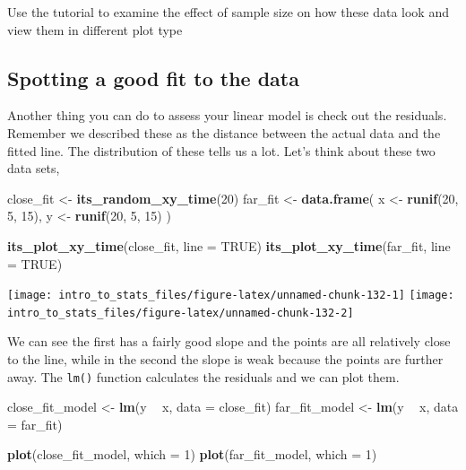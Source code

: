 \documentclass[
]{book}
\newenvironment{Shaded}{\begin{snugshade}}{\end{snugshade}}
\newcommand{\DataTypeTok}[1]{\textcolor[rgb]{0.13,0.29,0.53}{#1}}
\newcommand{\DecValTok}[1]{\textcolor[rgb]{0.00,0.00,0.81}{#1}}
\newcommand{\KeywordTok}[1]{\textcolor[rgb]{0.13,0.29,0.53}{\textbf{#1}}}
\newcommand{\NormalTok}[1]{#1}
\newcommand{\OperatorTok}[1]{\textcolor[rgb]{0.81,0.36,0.00}{\textbf{#1}}}
\newcommand{\OtherTok}[1]{\textcolor[rgb]{0.56,0.35,0.01}{#1}}
\newcommand{\StringTok}[1]{\textcolor[rgb]{0.31,0.60,0.02}{#1}}
\newenvironment{task}
{ \begin{tcolorbox}[title=For you to do,title filled] }
{  \end{tcolorbox} }
\begin{document}
\begin{task}
Use the tutorial to examine the effect of sample size on how these data look and view them in different plot type
\end{task}

\hypertarget{spotting-a-good-fit-to-the-data}{%
\subsection{Spotting a good fit to the data}\label{spotting-a-good-fit-to-the-data}}

Another thing you can do to assess your linear model is check out the residuals. Remember we described these as the distance between the actual data and the fitted line. The distribution of these tells us a lot. Let's think about these two data sets,

\begin{Shaded}
\begin{Highlighting}[]
\NormalTok{close_fit <-}\StringTok{ }\KeywordTok{its_random_xy_time}\NormalTok{(}\DecValTok{20}\NormalTok{)}
\NormalTok{far_fit <-}\StringTok{ }\KeywordTok{data.frame}\NormalTok{(}
\NormalTok{  x <-}\StringTok{ }\KeywordTok{runif}\NormalTok{(}\DecValTok{20}\NormalTok{, }\DecValTok{5}\NormalTok{, }\DecValTok{15}\NormalTok{),}
\NormalTok{  y <-}\StringTok{ }\KeywordTok{runif}\NormalTok{(}\DecValTok{20}\NormalTok{, }\DecValTok{5}\NormalTok{, }\DecValTok{15}\NormalTok{)}
\NormalTok{)}

\KeywordTok{its_plot_xy_time}\NormalTok{(close_fit, }\DataTypeTok{line =} \OtherTok{TRUE}\NormalTok{)}
\KeywordTok{its_plot_xy_time}\NormalTok{(far_fit, }\DataTypeTok{line =} \OtherTok{TRUE}\NormalTok{)}
\end{Highlighting}
\end{Shaded}

\texttt{[image: intro\_to\_stats\_files/figure-latex/unnamed-chunk-132-1]} \texttt{[image: intro\_to\_stats\_files/figure-latex/unnamed-chunk-132-2]}

We can see the first has a fairly good slope and the points are all relatively close to the line, while in the second the slope is weak because the points are further away. The \texttt{lm()} function calculates the residuals and we can plot them.

\begin{Shaded}
\begin{Highlighting}[]
\NormalTok{close_fit_model <-}\StringTok{ }\KeywordTok{lm}\NormalTok{(y }\OperatorTok{~}\StringTok{ }\NormalTok{x, }\DataTypeTok{data =}\NormalTok{ close_fit)}
\NormalTok{far_fit_model <-}\StringTok{ }\KeywordTok{lm}\NormalTok{(y }\OperatorTok{~}\StringTok{ }\NormalTok{x, }\DataTypeTok{data =}\NormalTok{ far_fit)}

\KeywordTok{plot}\NormalTok{(close_fit_model, }\DataTypeTok{which =} \DecValTok{1}\NormalTok{)}
\KeywordTok{plot}\NormalTok{(far_fit_model, }\DataTypeTok{which =} \DecValTok{1}\NormalTok{)}
\end{Highlighting}
\end{Shaded}
\end{document}
